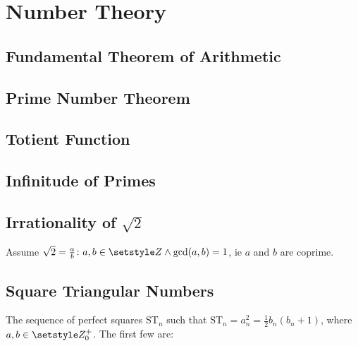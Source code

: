 \section{Number Theory}

\subsection{Fundamental Theorem of Arithmetic}

\subsection{Prime Number Theorem}

\subsection{Totient Function} \label{sec_totient}

\subsection{Infinitude of Primes}

\subsection[Irrationality of \texorpdfstring{\(\sqrt 2\)}{the Square Root of 2}]
           {Irrationality of \boldmath\(\sqrt 2\)}

Assume \(\sqrt 2 = \frac ab \colon a, b \in \Integers \land \gcd(a, b) = 1\),
ie
\(a\) and \(b\) are coprime.

\subsection{Square Triangular Numbers}


The sequence of perfect squares \(\mathrm{ST}_n\) such that
\(\mathrm{ST}_n= a_n^2 = \frac 12 b_n(b_n + 1)\), where
\(a, b \in \Integers_0^+\). The first few are:


